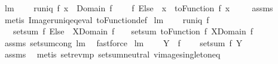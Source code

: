 \begin{isabellebody}
\isanewline
{}\isamarkupfalse%
\ lm{}{}{}{\isacharcolon}\ \isanewline
\ \ \ {\isachardoublequoteopen}runiq\ f{\isachardoublequoteclose}\ {\isachardoublequoteopen}x\ {\isasymin}\ Domain\ f{\isachardoublequoteclose}\ \isanewline
\ \ \ {\isachardoublequoteopen}{\isacharparenleft}f\ Else\ {}{\isacharparenright}\ x\ {\isacharequal}\ {\isacharparenleft}toFunction\ f{\isacharparenright}\ x{\isachardoublequoteclose}\ \isanewline
%
\isadelimproof
\ \ %
\endisadelimproof
%
\isatagproof
{}\isamarkupfalse%
\ assms\ \isamarkupfalse%
\ {\isacharparenleft}metis\ Image{\isacharunderscore}runiq{\isacharunderscore}eq{\isacharunderscore}eval\ toFunction{\isacharunderscore}def{\isacharparenright}%
\endisatagproof
{\isafoldproof}%
%
\isadelimproof
\isanewline
%
\endisadelimproof
\isanewline
{}\isamarkupfalse%
\ lm{}{}{}{\isacharcolon}\ \isanewline
\ \ \ {\isachardoublequoteopen}runiq\ f{\isachardoublequoteclose}\ \isanewline
\ \ \ {\isachardoublequoteopen}setsum\ {\isacharparenleft}f\ Else\ {}{\isacharparenright}\ {\isacharparenleft}X{\isasyminter}{\isacharparenleft}Domain\ f{\isacharparenright}{\isacharparenright}\ \ {\isacharequal}\ \ setsum\ {\isacharparenleft}toFunction\ f{\isacharparenright}\ {\isacharparenleft}X{\isasyminter}{\isacharparenleft}Domain\ f{\isacharparenright}{\isacharparenright}{\isachardoublequoteclose}\ \isanewline
%
\isadelimproof
\ \ %
\endisadelimproof
%
\isatagproof
{}\isamarkupfalse%
\ assms\ setsum{\isachardot}cong\ lm{}{}{}\ \isamarkupfalse%
\ fastforce%
\endisatagproof
{\isafoldproof}%
%
\isadelimproof
\isanewline
%
\endisadelimproof
\isanewline
{}\isamarkupfalse%
\ lm{}{}{}{\isacharcolon}\ \isanewline
\ \ \ {\isachardoublequoteopen}Y\ {\isasymsubseteq}\ f{\isacharminus}{\isacharbackquote}{\isacharbraceleft}{}{\isacharbraceright}{\isachardoublequoteclose}\ \isanewline
\ \ \ {\isachardoublequoteopen}setsum\ f\ Y\ \ {\isacharequal}\ \ {}{\isachardoublequoteclose}\ \isanewline
%
\isadelimproof
\ \ %
\endisadelimproof
%
\isatagproof
{}\isamarkupfalse%
\ assms\ \isamarkupfalse%
\ {\isacharparenleft}metis\ set{\isacharunderscore}rev{\isacharunderscore}mp\ setsum{\isachardot}neutral\ vimage{\isacharunderscore}singleton{\isacharunderscore}eq{\isacharparenright}%

\end{isabellebody}
